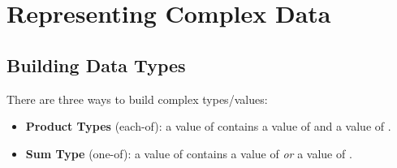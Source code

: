 \documentclass[letterpaper]{article}
\begin{document}
\section{Representing Complex Data}

\subsection{Building Data Types}
There are three ways to build complex types/values: 
\begin{itemize}
    \item \textbf{Product Types} (each-of): a value of  contains a value of  and a value of .
    \item \textbf{Sum Type} (one-of): a value of  contains a value of  \emph{or} a value of .
\end{itemize}
\end{document}

